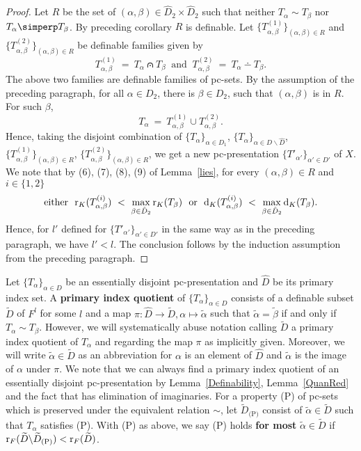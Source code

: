 \begin{proof}
Let $ R $ be the set of $ (\alpha, \beta) \in \hat{D}_2 \times \hat{D}_2$ such that neither $  T_\alpha\sim T_\beta $ nor $T_\alpha\simperp T_\beta$. By preceding corollary $R$ is definable.
Let $ \{ T^{(1)}_{\alpha, \beta}\}_{ (\alpha, \beta) \in R}$ and  $ \{ T^{(2)}_{\alpha, \beta}\}_{ (\alpha, \beta) \in R}$ be  definable families given by 
$$T^{(1)}_{\alpha, \beta}\ =\ T_\alpha \capdot T_\beta\ \text{ and }\ T^{(2)}_{\alpha, \beta}\ =\ T_\alpha \dotminus T_\beta.$$
The above two families are definable families of pc-sets.
By the assumption of the preceding paragraph, for all $\alpha \in D_2$, there is $\beta \in D_2$, such that $( \alpha,\beta)$ is in $R$. For such $\beta$, 
$$T_\alpha\ =\ T^{(1)}_{\alpha, \beta} \cup T^{(2)}_{\alpha, \beta}.$$
Hence, taking the disjoint combination of $ \{ T_\alpha\}_{ \alpha \in \hat{D}_1}$, $ \{ T_\alpha\}_{ \alpha \in {D\backslash \hat{D}}}$, $ \{ T^{(1)}_{\alpha, \beta}\}_{ (\alpha, \beta) \in R}$, $ \{ T^{(2)}_{\alpha, \beta}\}_{ (\alpha, \beta) \in R}$, we get a new pc-presentation $ \{ T'_{\alpha'}\}_{ \alpha' \in D'}$ of $X$. We note that by (6), (7), (8), (9) of Lemma~\ref{lies}, for every $(\alpha, \beta) \in R$ and $i \in \{1,2\}$ 
$$\text{either }\ \mathrm{r}_K(T^{(i)}_{\alpha, \beta})\ <\ \max_{ \beta \in \hat{D}_2} \mathrm{r}_K(T_\beta) \ \text{ or } \ \mathrm{d}_K(T^{(i)}_{\alpha, \beta})\ <\ \max_{ \beta \in \hat{D}_2} \mathrm{d}_K(T_\beta).$$
Hence, for $l'$ defined for $\{ T'_{\alpha'}\}_{ \alpha' \in D'}$ in the same way as in the preceding paragraph, we have $l'<l$. The conclusion follows by the induction assumption from the preceding paragraph.
\end{proof}

\noindent
Let $\{T_\alpha\}_{\alpha \in D}$ be an essentially disjoint pc-presentation and $\hat{D}$ be its primary index set. A {\bf primary index quotient} of $\{T_\alpha\}_{\alpha \in D}$ consists of a definable subset $\widetilde{D}$ of $F^l$ for some $l$ and a map $\pi: \hat{D} \to \widetilde{D}, \alpha \mapsto \tilde{\alpha}$ such that $\tilde{\alpha}= \tilde{\beta}$ if and only if $T_\alpha \sim T_\beta$. However, we will systematically abuse notation calling $\widetilde{D}$ a primary index quotient of $T_\alpha$ and regarding the map $\pi$ as implicitly given. Moreover, we will write $\tilde{\alpha} \in \widetilde{D}$ as an abbreviation for $\alpha$ is an element of $\hat{D}$ and $\tilde{\alpha}$ is the image of $\alpha$ under $\pi$.
We note that we can always find a primary index quotient of an essentially disjoint pc-presentation by Lemma~\ref{Definability}, Lemma~\ref{QuanRed} and the fact that  has elimination of imaginaries. 
For a property (P) of pc-sets which is preserved under the equivalent relation $\sim$,
let $\widetilde{D}_{\text{(P)}}$ 
consist of $\tilde{\alpha} \in \widetilde{D}$ such that $T_\alpha$ satisfies (P).
With (P) as above, we say (P) holds {\bf for most} $\tilde{\alpha} \in \widetilde{D}$ if $\mathrm{r}_F(\widetilde{D} \backslash \widetilde{D}_{\text{(P)}}) < \mathrm{r}_F( \widetilde{D})$.


